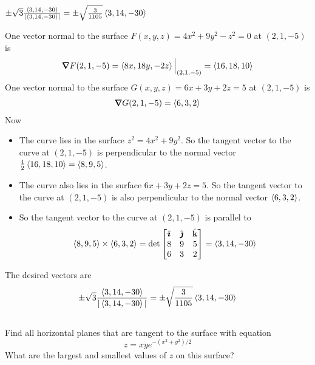 \begin{answer}
$\pm\sqrt{3}\frac{\left< 3,14,-30\right>}{|\left< 3,14,-30\right>|}
=\pm\sqrt{\frac{3}{1105}}\left< 3,14,-30\right>$
\end{answer}

\begin{solution}
One vector normal to the surface $F(x,y,z)=4x^2+9y^2-z^2=0$ at $(2,1,-5)$ is
\begin{align*}
\vnabla F(2,1,-5) = \llt 8x,18y,-2z\rgt\Big|_{(2,1,-5)}=\llt 16,18,10\rgt
\end{align*}
One vector normal to the surface $G(x,y,z)=6x+3y+2z=5$ at 
$(2,1,-5)$ is 
\begin{align*}
\vnabla G(2,1,-5) = \llt 6,3,2\rgt
\end{align*}
Now
\begin{itemize}
\item
The curve lies in the surface $z^2=4x^2+9y^2$. So the tangent vector to the
curve at $(2,1,-5)$ is perpendicular to the normal vector 
$\frac{1}{2}\left< 16,18,10\right>=\left< 8,9,5\right>$.
\item
The curve also lies in the surface $6x+3y+2z=5$. So the tangent vector to the
curve at $(2,1,-5)$ is also perpendicular to the normal vector $\left< 6,3,2\right>$.
\item
So the tangent vector to the curve at $(2,1,-5)$ is parallel to
\begin{align*}
\left< 8,9,5\right>\times \left< 6,3,2\right>
=\det\left[\begin{matrix}
                     \hat{\pmb{\imath}} & \hat{\pmb{\jmath}} & \hat{\mathbf{k}} \\
                     8   &  9  & 5 \\
                     6   &  3  & 2
                \end{matrix}\right]
=\left< 3,14,-30\right>
\end{align*}
\end{itemize}
The desired vectors are
\begin{equation*}
\pm\sqrt{3}\frac{\left< 3,14,-30\right>}{|\left< 3,14,-30\right>|}
=\pm\sqrt{\frac{3}{1105}}\left< 3,14,-30\right>
\end{equation*}
\end{solution}




\subsection*{\Application}

\begin{question}
Find all horizontal planes that are tangent to the surface with equation
\begin{equation*}
z=xy e^{-(x^2+y^2)/2}
\end{equation*}
What are the largest and smallest values of $z$ on this surface?
\end{question}

